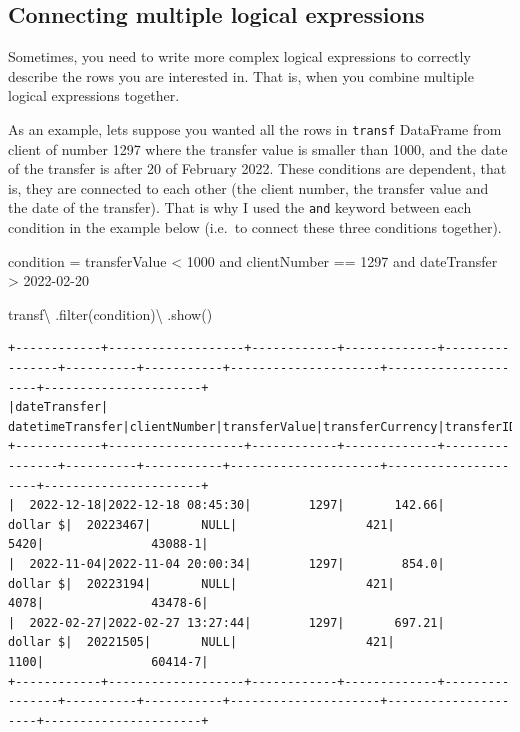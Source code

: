 \documentclass[
  11pt,
  letterpaper,
  DIV=11,
  numbers=noendperiod]{scrreprt}
\newenvironment{Shaded}{\begin{snugshade}}{\end{snugshade}}
\newcommand{\BuiltInTok}[1]{\textcolor[rgb]{0.00,0.23,0.31}{#1}}
\newcommand{\NormalTok}[1]{\textcolor[rgb]{0.00,0.23,0.31}{#1}}
\newcommand{\OperatorTok}[1]{\textcolor[rgb]{0.37,0.37,0.37}{#1}}
\newcommand{\StringTok}[1]{\textcolor[rgb]{0.13,0.47,0.30}{#1}}
\begin{document}
\hypertarget{connecting-multiple-logical-expressions}{%
\subsection{Connecting multiple logical
expressions}\label{connecting-multiple-logical-expressions}}

Sometimes, you need to write more complex logical expressions to
correctly describe the rows you are interested in. That is, when you
combine multiple logical expressions together.

As an example, lets suppose you wanted all the rows in \texttt{transf}
DataFrame from client of number 1297 where the transfer value is smaller
than 1000, and the date of the transfer is after 20 of February 2022.
These conditions are dependent, that is, they are connected to each
other (the client number, the transfer value and the date of the
transfer). That is why I used the \texttt{and} keyword between each
condition in the example below (i.e.~to connect these three conditions
together).

\begin{Shaded}
\begin{Highlighting}[]
\NormalTok{condition }\OperatorTok{=} \StringTok{\textquotesingle{}\textquotesingle{}\textquotesingle{}}
\StringTok{  transferValue \textless{} 1000}
\StringTok{  and clientNumber == 1297 }
\StringTok{  and dateTransfer \textgreater{} \textquotesingle{}2022{-}02{-}20\textquotesingle{}}
\StringTok{\textquotesingle{}\textquotesingle{}\textquotesingle{}}

\NormalTok{transf}\OperatorTok{\textbackslash{}}
\NormalTok{  .}\BuiltInTok{filter}\NormalTok{(condition)}\OperatorTok{\textbackslash{}}
\NormalTok{  .show()}
\end{Highlighting}
\end{Shaded}

\begin{verbatim}
+------------+-------------------+------------+-------------+----------------+----------+-----------+---------------------+---------------------+----------------------+
|dateTransfer|   datetimeTransfer|clientNumber|transferValue|transferCurrency|transferID|transferLog|destinationBankNumber|destinationBankBranch|destinationBankAccount|
+------------+-------------------+------------+-------------+----------------+----------+-----------+---------------------+---------------------+----------------------+
|  2022-12-18|2022-12-18 08:45:30|        1297|       142.66|        dollar $|  20223467|       NULL|                  421|                 5420|               43088-1|
|  2022-11-04|2022-11-04 20:00:34|        1297|        854.0|        dollar $|  20223194|       NULL|                  421|                 4078|               43478-6|
|  2022-02-27|2022-02-27 13:27:44|        1297|       697.21|        dollar $|  20221505|       NULL|                  421|                 1100|               60414-7|
+------------+-------------------+------------+-------------+----------------+----------+-----------+---------------------+---------------------+----------------------+
\end{verbatim}
\end{document}
